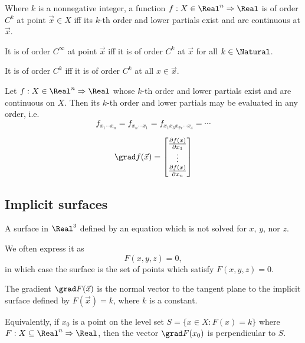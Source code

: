 \begin{definition}[$C^k$ function]
  Where $k$ is a nonnegative integer, a function $f : X \in \Real^n \Rightarrow \Real$ is of order $C^k$ at point $\vec{x} \in X$ iff its $k$-th order and lower partials exist and are continuous at $\vec{x}$. 

  It is of order $C^\infty$ at point $\vec{x}$ iff it is of order $C^k$ at $\vec{x}$ for all $k \in \Natural$.
  
  It is of order $C^k$ iff it is of order $C^k$ at all $x \in \vec{x}$.
\end{definition}

\begin{theorem}
  Let $f : X \in \Real^n \Rightarrow \Real$ whose $k$-th order and lower partials exist and are continuous on $X$. Then its $k$-th order and lower partials may be evaluated in any order, i.e.
  \[
    f_{x_1 \cdots x_n} = f_{x_n \cdots x_1} = f_{x_1 x_3 x_{27} \cdots x_4} = \cdots
  \]
\end{theorem}

\begin{definition}[Gradient]
  \[
    \grad f(\vec{x}) = \begin{bmatrix}
      \frac{\partial f(x)}{\partial x_1} \\
      \vdots \\
      \frac{\partial f(x)}{\partial x_n}
    \end{bmatrix}
  \]
\end{definition}

\subsection{Implicit surfaces}


\begin{definition}
  A surface in $\Real^3$ defined by an equation which is not solved for $x$, $y$, nor $z$.

  We often express it as
  \[
    F(x, y, z) = 0,
  \]
  in which case the surface is the set of points which satisfy $F(x, y, z) = 0$.
\end{definition}

\begin{theorem}
  The gradient $\grad F(\vec{x})$ is the normal vector to the tangent plane to the implicit surface defined by $F(\vec{x}) = k$, where $k$ is a constant.

  Equivalently, if $x_0$ is a point on the level set $S = \{ x \in X : F(x) = k \}$ where $F : X \subseteq \Real^n \Rightarrow \Real$, then the vector $\grad F(x_0)$ is perpendicular to $S$.
\end{theorem}

